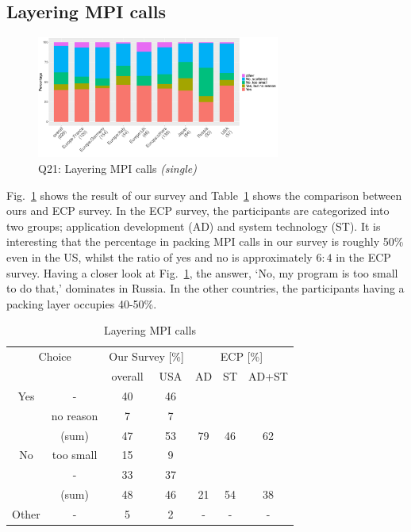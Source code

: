 \documentclass[conference,10pt,letterpaper]{IEEEtran}
\def\myquote#1{`#1'}
\begin{document}
\subsection{Layering MPI calls}

\begin{figure}[htb]
  \begin{center}
    \includegraphics[width=8cm]{R-scripts/Q21.pdf}
    \caption{Q21: Layering MPI calls {\it(single)}}
    \label{fig:layering-mpi-calls}
  \end{center}
\end{figure}

Fig.~\ref{fig:layering-mpi-calls} shows the result of our survey and
Table~\ref{tab:layering-mpi-calls} shows the comparison between ours
and ECP survey. In the ECP survey, the participants are categorized
into two groups; application development (AD) and system technology
(ST). It is interesting that the percentage in packing MPI calls
in our survey is roughly 50\% even in the US, whilst the ratio of yes
and no is approximately $6:4$ in the ECP survey.
Having a closer look at Fig.~\ref{fig:layering-mpi-calls}, the answer,
\myquote{No, my program is too small to do that,} dominates in Russia. In
the other countries, the participants having a packing layer occupies
40-50\%. 

\begin{table}[htb]%
  \begin{center}%
    \caption{Layering MPI calls}\label{tab:layering-mpi-calls}%
    \begin{tabular}{c|c||c|c||c|c|c}%
      \hline%
      \multicolumn{2}{c||}{Choice} & \multicolumn{2}{c||}{Our Survey [\%]} &
      \multicolumn{3}{c}{ECP [\%]} \\
      \cline{3-7}%
      \multicolumn{2}{c||}{} & overall & USA & AD & ST & AD+ST \\
      \hline%
      \hline%
      Yes & - & 40 & 46 & & & \\
      & no reason & 7 & 7 & & & \\
      \cline{2-4}%
      & (sum) & 47 & 53 &  79 & 46 & 62 \\
      \hline%
      \hline%
      No & too small & 15 & 9 & & & \\
      & - & 33 & 37 & & & \\
      \cline{2-4}%
      & (sum) & 48 & 46 & 21 & 54 & 38 \\
      \hline%
      Other & - & 5 & 2 & - & - & - \\
      \hline%
    \end{tabular}%
  \end{center}%
\end{table}%
\end{document}
